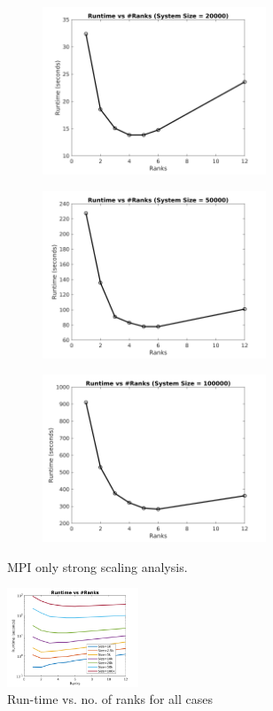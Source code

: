 \documentclass[sigplan,screen]{acmart}
\begin{document}
\begin{figure}
\begin{subfigure}{0.4\textwidth}
		\caption{}
	\end{subfigure}
	\begin{subfigure}{0.4\textwidth}
		\includegraphics[trim= 20 5 35 10,clip, width=0.95\linewidth, height=5cm]{plots/MPI_strong_20k.png} 
		\caption{}
	\end{subfigure}
	\begin{subfigure}{0.4\textwidth}
		\includegraphics[trim= 20 5 35 10,clip, width=0.95\linewidth, height=5cm]{plots/MPI_strong_50k.png}
		\caption{}
	\end{subfigure}
	\begin{subfigure}{0.4\textwidth}
		\includegraphics[trim= 20 5 35 10,clip, width=0.95\linewidth, height=5cm]{plots/MPI_strong_100k.png}
		\caption{}
	\end{subfigure}
	\caption{MPI only strong scaling analysis.}
	\label{strong1}
\end{figure}

\begin{figure}[h!]
	\begin{center}
		\includegraphics[width=0.35\textwidth]{plots/MPI_strong_allranks_log.png}
	\end{center}
	\caption{Run-time vs. no. of ranks for all cases}
	\label{strong2}      
\end{figure}
\end{document}
